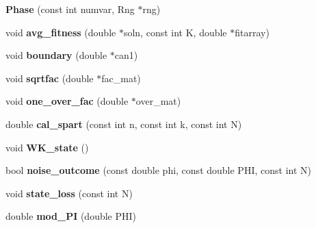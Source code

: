 \begin{DoxyCompactItemize}
\item 
\hypertarget{classPhase_a693a2d20b39fa8a91bf5f4c1afa3b2e2}{}{\bfseries Phase} (const int numvar, Rng $\ast$rng)\label{classPhase_a693a2d20b39fa8a91bf5f4c1afa3b2e2}

\item 
\hypertarget{classPhase_a73864e5e5e43b6fb301cf507eeb118a4}{}void {\bfseries avg\+\_\+fitness} (double $\ast$soln, const int K, double $\ast$fitarray)\label{classPhase_a73864e5e5e43b6fb301cf507eeb118a4}

\item 
\hypertarget{classPhase_a47d8ce9a16f64faa174dd69c3854e3e1}{}void {\bfseries boundary} (double $\ast$can1)\label{classPhase_a47d8ce9a16f64faa174dd69c3854e3e1}

\item 
\hypertarget{classPhase_a6100300c5e784c829375cceb5bf2de4c}{}void {\bfseries sqrtfac} (double $\ast$fac\+\_\+mat)\label{classPhase_a6100300c5e784c829375cceb5bf2de4c}

\item 
\hypertarget{classPhase_a3e758e9903183f98b634c09ec033517f}{}void {\bfseries one\+\_\+over\+\_\+fac} (double $\ast$over\+\_\+mat)\label{classPhase_a3e758e9903183f98b634c09ec033517f}

\item 
\hypertarget{classPhase_a386cfe3967d7b3cb11b66ded52237b85}{}double {\bfseries cal\+\_\+spart} (const int n, const int k, const int N)\label{classPhase_a386cfe3967d7b3cb11b66ded52237b85}

\item 
\hypertarget{classPhase_a58a0068df688f770ed388ad6bf63aa4f}{}void {\bfseries W\+K\+\_\+state} ()\label{classPhase_a58a0068df688f770ed388ad6bf63aa4f}

\item 
\hypertarget{classPhase_a6e2d1dd46651a342f46893d93c30041c}{}bool {\bfseries noise\+\_\+outcome} (const double phi, const double P\+H\+I, const int N)\label{classPhase_a6e2d1dd46651a342f46893d93c30041c}

\item 
\hypertarget{classPhase_a51090ea3a1cd12e9afd73faa48d04627}{}void {\bfseries state\+\_\+loss} (const int N)\label{classPhase_a51090ea3a1cd12e9afd73faa48d04627}

\item 
\hypertarget{classPhase_a395efd15826aac4793a6c37bf027825b}{}double {\bfseries mod\+\_\+P\+I} (double P\+H\+I)\label{classPhase_a395efd15826aac4793a6c37bf027825b}

\end{DoxyCompactItemize}

